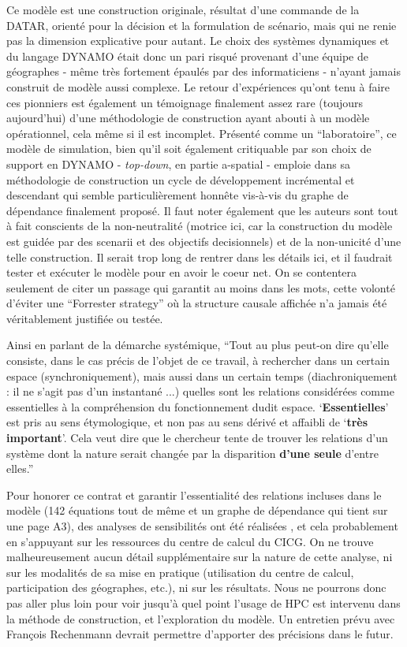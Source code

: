Ce modèle est une construction originale, résultat d'une commande de la DATAR, orienté pour la décision et la formulation de scénario, mais qui ne renie pas la dimension explicative pour autant. Le choix des systèmes dynamiques et du langage DYNAMO était donc un pari risqué provenant d'une équipe de géographes - même très fortement épaulés par des informaticiens - n'ayant jamais construit de modèle aussi complexe. Le retour d'expériences qu'ont tenu à faire ces pionniers est également un témoignage finalement assez rare (toujours aujourd'hui) d'une méthodologie de construction ayant abouti à un modèle opérationnel, cela même si il est incomplet. Présenté comme un \enquote{laboratoire}, ce modèle de simulation, bien qu'il soit également critiquable par son choix de support en DYNAMO - \textit{top-down}, en partie a-spatial - emploie dans sa méthodologie de construction un cycle de développement incrémental et descendant qui semble particulièrement honnête vis-à-vis du graphe de dépendance finalement proposé. Il faut noter également que les auteurs sont tout à fait conscients de la non-neutralité (motrice ici, car la construction du modèle est guidée par des scenarii et des objectifs decisionnels) et de la non-unicité d'une telle construction. Il serait trop long de rentrer dans les détails ici, et il faudrait tester et exécuter le modèle pour en avoir le coeur net. On se contentera seulement de citer un passage qui garantit au moins dans les mots, cette volonté d'éviter une \foreignquote{english}{Forrester strategy} \autocite[7-8]{Batty2001} où la structure causale affichée n'a jamais été véritablement justifiée ou testée.

Ainsi en parlant de la démarche systémique, \enquote{Tout au plus peut-on dire qu'elle consiste, dans le cas précis de l'objet de ce travail, à rechercher dans un certain espace (synchroniquement), mais aussi dans un certain temps (diachroniquement : il ne s'agit pas d'un instantané ...) quelles sont les relations considérées comme essentielles à la compréhension du fonctionnement dudit espace. \enquote{\textbf{Essentielles}} est pris au sens étymologique, et non pas au sens dérivé et affaibli de \enquote{\textbf{très important}}. Cela veut dire que le chercheur tente de trouver les relations d'un système dont la nature serait changée par la disparition \textbf{d'une seule} d'entre elles.} \autocite{AMORAL1983}

Pour honorer ce contrat et garantir l'essentialité des relations incluses dans le modèle (142 équations tout de même et un graphe de dépendance qui tient sur une page A3), des analyses de sensibilités ont été réalisées \autocite[34]{AMORAL1983}, et cela probablement en s'appuyant sur les ressources du centre de calcul du CICG. On ne trouve malheureusement aucun détail supplémentaire sur la nature de cette analyse, ni sur les modalités de sa mise en pratique (utilisation du centre de calcul, participation des géographes, etc.), ni sur les résultats. Nous ne pourrons donc pas aller plus loin pour voir jusqu'à quel point l'usage de HPC est intervenu dans la méthode de construction, et l'exploration du modèle. Un entretien prévu avec François Rechenmann devrait permettre d'apporter des précisions dans le futur.


